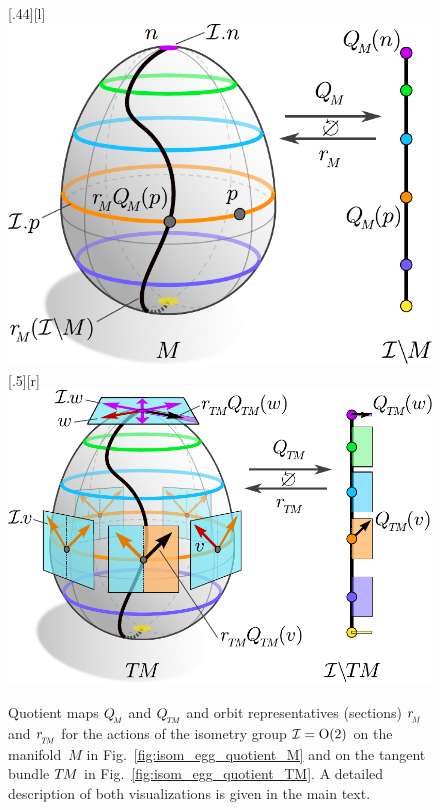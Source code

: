 \begin{figure}
    \centering%
        [.44\linewidth][l]{%
            \includegraphics[width=.43\textwidth]{figures/isometry_egg_quotient_M.pdf}%
            \vspace*{1ex}%
        }%
    \hfill%
        [.5\linewidth][r]{%
            \includegraphics[width=.5\textwidth]{figures/isometry_egg_quotient_TM.pdf}%
            \vspace*{1ex}%
        }%
    \caption{\small%
        Quotient maps $\QM$ and $\QTM$ and orbit representatives (sections) $\rM$ and $\rTM$ for the actions of the isometry group $\mathcal{I}=\operatorname{O}(2)$ on the manifold~$M$ in Fig.~\ref{fig:isom_egg_quotient_M} and on the tangent bundle $T\mkern-1.5muM$ in Fig.~\ref{fig:isom_egg_quotient_TM}.
        A detailed description of both visualizations is given in the main text.
    }%
    \label{fig:isom_egg_quotient_main}%
\end{figure}

